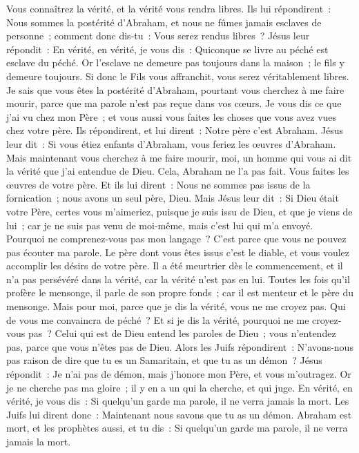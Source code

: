 \begin{multicols}{2}
Vous connaîtrez la vérité, et la vérité vous rendra libres.
Ils lui répondirent~: Nous sommes la postérité d'Abraham, et nous ne fûmes jamais esclaves de personne~; comment donc dis-tu~: Vous serez rendus libres~?
Jésus leur répondit~: En vérité, en vérité, je vous dis~: Quiconque se livre au péché est esclave du péché.
Or l'esclave ne demeure pas toujours dans la maison~; le fils y demeure toujours.
Si donc le Fils vous affranchit, vous serez véritablement libres.
Je sais que vous êtes la postérité d'Abraham, pourtant vous cherchez à me faire mourir, parce que ma parole n'est pas reçue dans vos cœurs.
Je vous dis ce que j'ai vu chez mon Père~; et vous aussi vous faites les choses que vous avez vues chez votre père.
Ils répondirent, et lui dirent~: Notre père c'est Abraham. Jésus leur dit~: Si vous étiez enfants d'Abraham, vous feriez les œuvres d'Abraham.
Mais maintenant vous cherchez à me faire mourir, moi, un homme qui vous ai dit la vérité que j'ai entendue de Dieu. Cela, Abraham ne l'a pas fait.
Vous faites les œuvres de votre père. Et ils lui dirent~: Nous ne sommes pas issus de la fornication~; nous avons un seul père, Dieu.
Mais Jésus leur dit~: Si Dieu était votre Père, certes vous m'aimeriez, puisque je suis issu de Dieu, et que je viens de lui~; car je ne suis pas venu de moi-même, mais c'est lui qui m'a envoyé.
Pourquoi ne comprenez-vous pas mon langage~? C'est parce que vous ne pouvez pas écouter ma parole.
Le père dont vous êtes issus c'est le diable, et vous voulez accomplir les désirs de votre père. Il a été meurtrier dès le commencement, et il n'a pas persévéré dans la vérité, car la vérité n'est pas en lui. Toutes les fois qu'il profère le mensonge, il parle de son propre fonds~; car il est menteur et le père du mensonge.
Mais pour moi, parce que je dis la vérité, vous ne me croyez pas.
Qui de vous me convaincra de péché~? Et si je dis la vérité, pourquoi ne me croyez-vous pas~?
Celui qui est de Dieu entend les paroles de Dieu~; vous n'entendez pas, parce que vous n'êtes pas de Dieu.
Alors les Juifs répondirent~: N'avons-nous pas raison de dire que tu es un Samaritain, et que tu as un démon~?
Jésus répondit~: Je n'ai pas de démon, mais j'honore mon Père, et vous m'outragez.
Or je ne cherche pas ma gloire~; il y en a un qui la cherche, et qui juge.
En vérité, en vérité, je vous dis~: Si quelqu'un garde ma parole, il ne verra jamais la mort.
Les Juifs lui dirent donc~: Maintenant nous savons que tu as un démon. Abraham est mort, et les prophètes aussi, et tu dis~: Si quelqu'un garde ma parole, il ne verra jamais la mort.

\end{multicols}

